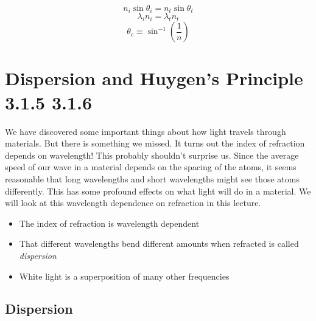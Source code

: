 \documentclass{article}
\begin{document}
\[
n_{i}\sin \theta _{i}=n_{t}\sin \theta _{t}
\]%
\[
\lambda _{i}n_{i}=\lambda _{t}n_{t}
\]%
\[
\theta _{c}\equiv \sin ^{-1}\left( \frac{1}{n}\right)
\]

\section{Dispersion and Huygen's Principle 3.1.5 3.1.6}

We have discovered some important things about how light travels through
materials. But there is something we missed. It turns out the index of
refraction depends on wavelength! This probably shouldn't surprise us. Since
the average speed of our wave in a material depends on the spacing of the
atoms, it seems reasonable that long wavelengths and short wavelengths might
see those atoms differently. This has some profound effects on what light
will do in a material. We will look at this wavelength dependence on
refraction in this lecture.

\vspace{0.10in}%

\begin{itemize}
\item The index of refraction is wavelength dependent

\item That different wavelengths bend different amounts when refracted is
called \emph{dispersion}

\item White light is a superposition of many other frequencies
\end{itemize}

\subsection{Dispersion}

\end{document}
